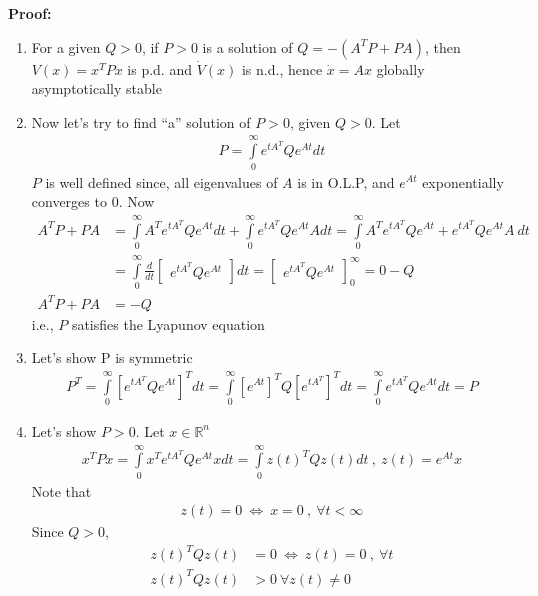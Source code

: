 \documentclass[twoside]{article}
\begin{document}
\textbf{Proof:} 
\begin{enumerate}
\item For a given $Q > 0$, if $P > 0$ is a solution of $Q = - (A^T P + P A)$, then $V(x) = x^T P x$ is p.d. and $\dot{V}(x)$ is n.d., hence
$\dot{x} = A x$ globally asymptotically stable
%
\item Now let's try to find ``a'' solution of $P > 0$, given $Q>0$. Let
%
\begin{align*}
P = \int\limits_{0}^{\infty} e^{t A^T} Q e^{A t} dt
\end{align*}
%
$P$ is well defined since, all eigenvalues of $A$ is in O.L.P, and 
$e^{A t}$ exponentially converges to $0$. Now
%
\begin{align*}
A^T P + P A &= \int\limits_{0}^{\infty} A^T e^{t A^T} Q e^{A t} dt
+ \int\limits_{0}^{\infty} e^{t A^T} Q e^{A t} A dt 
= \int\limits_{0}^{\infty} A^T e^{t A^T} Q e^{A t} + e^{t A^T} Q e^{A t} A \ dt
\\
&= \int\limits_{0}^{\infty} \frac{d}{dt} \begin{bmatrix}
    e^{t A^T} Q e^{A t}
\end{bmatrix} dt =  \begin{bmatrix}
    e^{t A^T} Q e^{A t} 
\end{bmatrix}_{0}^{\infty} = 0 -Q 
\\
A^T P + P A &= -Q
\end{align*}
%
i.e., $P$ satisfies the Lyapunov equation
%
\item Let's show P is symmetric
%
\begin{align*}
P^T = \int\limits_{0}^{\infty} \left[ e^{t A^T} Q e^{A t} \right]^T dt
= \int\limits_{0}^{\infty} \left[ e^{A t} \right]^T Q 
\left[ e^{t A^T}\right]^T dt
= \int\limits_{0}^{\infty} e^{t A^T} Q e^{A t} dt = P
\end{align*}
%
\item Let's show $P > 0$. Let $x \in \mathbb{R}^n$
%
\begin{align*}
x^T P x = \int\limits_{0}^{\infty} x^T e^{t A^T} Q e^{A t} x dt =
\int\limits_{0}^{\infty} z(t)^T Q z(t) dt \ , \  z(t) = e^{A t} x
\end{align*}
%
Note that 
%
\begin{align*}
z(t) = 0 \ \iff \ x = 0 \ , \  \forall t < \infty
\end{align*}
%
Since $Q > 0$, 
%
\begin{align*}
z(t)^T Q z(t) &= 0 \ \iff \ z(t) = 0 \ , \  \forall t 
\\
z(t)^T Q z(t) &> 0 \ \forall z(t) \neq 0

\end{align*}
\end{enumerate}
\end{document}
